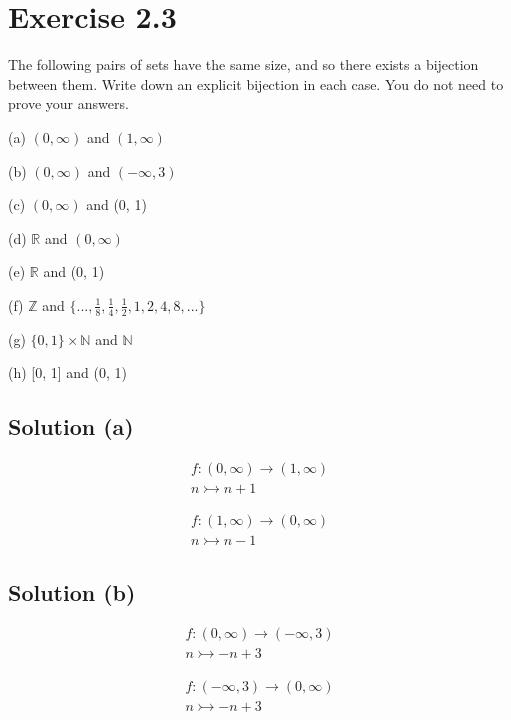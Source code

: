\documentclass[12pt]{report}
\begin{document}
\pagebreak
\section{Exercise 2.3}
The following pairs of sets have the same size, and  so there exists a bijection between them. Write down an explicit  bijection in each case. You do not need to prove your answers.  
\begin{multicols}{2}
    (a) $(0, \infty)$ and $(1, \infty)$ 

    (b) $(0, \infty)$ and $(-\infty, 3)$

    (c) $(0, \infty)$ and (0, 1) 

    (d) $\mathbb{R}$ and $(0, \infty)$  
    \columnbreak

    (e) $\mathbb{R}$ and (0, 1) 
    
    (f) $\mathbb{Z}$ and $\{ ..., \frac{1}{8}, \frac{1}{4}, \frac{1}{2}, 1, 2, 4, 8, ... \}$  
    
    (g) $\{0, 1\} \times \mathbb{N}$ and $\mathbb{N}$  
    
    (h) [0, 1] and (0, 1) 
\end{multicols}

\subsection{Solution (a)}
\begin{multicols}{2}
    \begin{gather}
        f : (0,\infty) \to (1,\infty)\\
        n \rightarrowtail n + 1
    \end{gather}
    
    \columnbreak
    \begin{gather}
        f : (1,\infty) \to (0,\infty)\\
        n \rightarrowtail n - 1
    \end{gather}
\end{multicols}

\subsection{Solution (b)}
\begin{multicols}{2}
    \begin{gather}
        f : (0,\infty) \to (-\infty, 3)\\
        n \rightarrowtail -n + 3
    \end{gather}

    \columnbreak
    \begin{gather}
        f : (-\infty, 3) \to (0,\infty)\\
        n \rightarrowtail -n + 3
    \end{gather}
    
\end{multicols}
\end{document}
